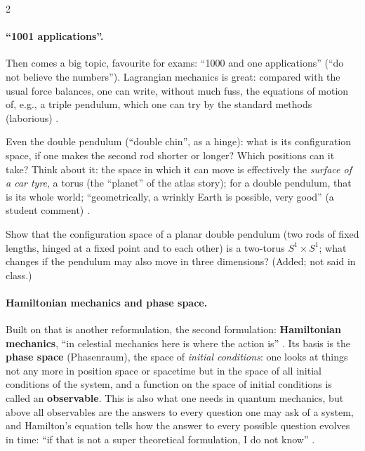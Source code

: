 \begin{paracol}{2}
\paragraph{``1001 applications''.} Then comes a big topic, favourite for exams: ``1000 and one applications'' (``do not
believe the numbers''). Lagrangian mechanics is great: compared with the usual force balances, one can write, without
much fuss, the equations of motion of, e.g., a triple pendulum, which one can try by the standard methods (laborious)
.
\begin{example}\label{ex:bv-double-pendulum}
Even the double pendulum (``double chin'', as a hinge): what is its configuration space, if one makes the
second rod shorter or longer? Which positions can it take? Think about it: the space in which it can move is effectively
the \emph{surface of a car tyre}, a torus (the ``planet'' of the atlas story); for a double pendulum, that is its
whole world; ``geometrically, a wrinkly Earth is possible, very good'' (a student comment) .
\end{example}
\begin{exercise}\label{ex:bv-torus}
Show that the configuration space of a planar double pendulum (two rods of fixed lengths, hinged at a fixed point and
to each other) is a two-torus $S^1\times S^1$; what changes if the pendulum may also move in three dimensions?
(Added; not said in class.)
\end{exercise}

\paragraph{Hamiltonian mechanics and phase space.} Built on that is another reformulation, the second formulation:
\textbf{Hamiltonian mechanics}, ``in celestial mechanics here is where the action is'' .
Its basis is the \textbf{phase space} (Phasenraum), the space of \emph{initial conditions}: one looks at things not any more
in position space or spacetime but in the space of all initial conditions of the system, and a function on the
space of initial conditions is called an \textbf{observable}. This is also what one needs in quantum mechanics, but above all
observables are the answers to every question one may ask of a system, and Hamilton's equation tells how the answer to
every possible question evolves in time: ``if that is not a super theoretical formulation, I do not know'' .


\end{paracol}
